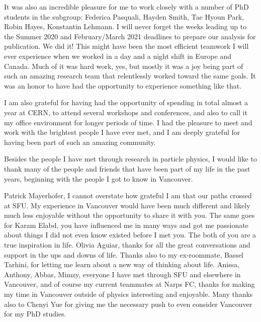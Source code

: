 It was also an incredible pleasure for me to work closely with a number of PhD students in the \HWW subgroup: 
Federica Pasquali, Hayden Smith, Tae Hyoun Park, Robin Hayes, Konstantin Lehmann. 
I will never forget the weeks leading up to the Summer 2020 and February/March 2021 deadlines to prepare our analysis for publication. We did it!
This might have been the most efficient teamwork I will ever experience when we worked in a day and a night shift in Europe and Canada. 
Much of it was hard work, yes, but mostly it was a joy being part of such an amazing research team that relentlessly worked toward the same goals. It was an honor to have had the opportunity to experience something like that. 

I am also grateful for having had the opportunity of spending in total almost a year at CERN, to attend several workshops and conferences, and also to call it my office environment for longer periods of time. 
I had the pleasure to meet and work with the brightest people I have ever met, and I am deeply grateful for having been part of such an amazing community. 

Besides the people I have met through research in particle physics, I would like to thank many of the people and friends that have been part of my life in the past years, beginning with the people I got to know in Vancouver. 

Patrick Mayerhofer, I cannot overstate how grateful I am that our paths crossed at SFU. My experience in Vancouver would have been much different and likely much less enjoyable without the opportunity to share it with you.
The same goes for Karam Elabd, you have influenced me in many ways and got me passionate about things I did not even know existed before I met you. The both of you are a true inspiration in life.
Olivia Aguiar, thanks for all the great conversations and support in the ups and downs of life. 
Thanks also to my ex-roommate, Bassel Tarhini, for letting me learn about a new way of thinking about life. 
Anissa, Anthony, Abbas, Mimzy, everyone I have met through SFU and elsewhere in Vancouver, and of course my current teammates at Narps FC, thanks for making my time in Vancouver outside of physics interesting and enjoyable. 
Many thanks also to Chenyi Yue for giving me the necessary push to even consider Vancouver for my PhD studies. 

